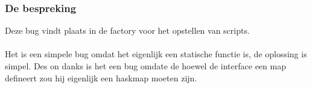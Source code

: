 \documentclass[a4paper]{article}
\begin{document}
\subsubsection{De bespreking}
Deze bug vindt plaats in de factory voor het opstellen van scripts.
\paragraph{}
Het is een simpele bug omdat het eigenlijk een statische functie is, de oplossing is simpel. Des on danks is het een bug omdate de hoewel de interface een map defineert zou hij eigenlijk een haskmap moeten zijn.

\end{document}
